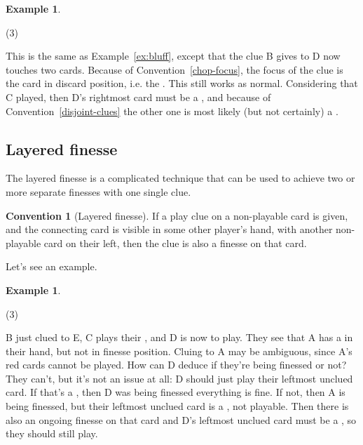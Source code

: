 \documentclass[a4paper]{article}
\theoremstyle{plain}
\theoremstyle{definition}
\newtheorem{example}[theorem]{Example}
\newtheorem{convention}[theorem]{Convention}
\begin{document}
\begin{example}
	\hfill
	\begin{tasks}(3)
		\task[+]      
		\task[A]    
		\task[B]    
		\task[C]    
		\task[D]    
		\task[E]    
	\end{tasks}
	
	This is the same as Example~\ref{ex:bluff}, except that the  clue B gives to D now touches two cards. Because of Convention~\ref{chop-focus}, the focus of the clue is the card in discard position, i.e. the . This still works as normal. Considering that C played, then D's rightmost card must be a , and because of Convention~\ref{disjoint-clues} the other one is most likely (but not certainly) a .
\end{example}

\subsection{Layered finesse}

The layered finesse is a complicated technique that can be used to achieve two or more separate finesses with one single clue.

\begin{convention}[Layered finesse]
	\label{layered-finesse}
	If a play clue on a non-playable card is given, and the connecting card is visible in some other player's hand, with another non-playable card on their left, then the clue is also a finesse on that card.
\end{convention}

Let's see an example.

\begin{example}
	\hfill	
	\begin{tasks}(3)
		\task[+]      
		\task[A]    
		\task[B]    
		\task[C]    
		\task[D]    
		\task[E]    
	\end{tasks}
	
	B just clued  to E, C plays their , and D is now to play. They see that A has a  in their hand, but not in finesse position. Cluing  to A may be ambiguous, since A's red cards cannot be played. How can D deduce if they're being finessed or not? They can't, but it's not an issue at all: D should just play their leftmost unclued card. If that's a , then D was being finessed everything is fine. If not, then A is being finessed, but their leftmost unclued card is a , not playable. Then there is also an ongoing finesse on that card and D's leftmost unclued card must be a , so they should still play.	
\end{example}
\end{document}
